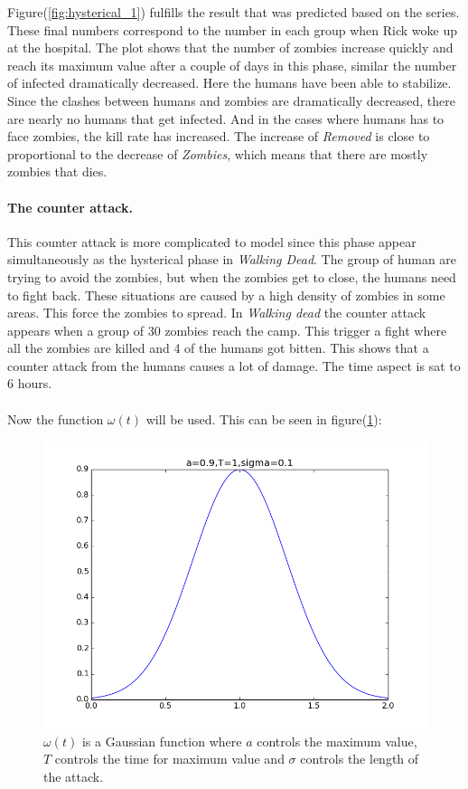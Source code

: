 \documentclass[%
twoside,                 %
final,                   %
10pt]{article}
\begin{document}
Figure(\ref{fig:hysterical_1}) fulfills the result that was predicted based on the series. These final numbers correspond to the number in each group when Rick woke up at the hospital. The plot shows that the number of zombies increase quickly and reach its maximum value after a couple of days in this phase, similar the number of infected dramatically decreased. Here the humans have been able to stabilize. Since the clashes between humans and zombies are dramatically decreased, there are nearly no humans that get infected. And in the cases where humans has to face zombies, the kill rate has increased. The increase of \emph{Removed} is close to proportional to the decrease of \emph{Zombies}, which means that there are mostly zombies that dies.

\paragraph{The counter attack.}
\label{section:counter_attack}
This counter attack is more complicated to model since this phase appear simultaneously as the hysterical phase in \emph{Walking Dead}. The group of human are trying to avoid the zombies, but when the zombies get to close, the humans need to fight back. These situations are caused by a high density of zombies in some areas. This force the zombies to spread. In \emph{Walking dead} the counter attack appears when a group of 30 zombies reach the camp. This trigger a fight where all the zombies are killed and 4 of the humans got bitten. This shows that a counter attack from the humans causes a lot of damage. The time aspect is sat to 6 hours.  
\\
\\
Now the function $\omega(t)$ will be used. This can be seen in figure(\ref{fig:omega_function}):


\begin{figure}[ht]
  \centerline{\includegraphics[width=0.9\linewidth]{plots/omega_function.png}}
  \caption{
  \label{fig:omega_function} $\omega (t)$ is a Gaussian function where $a$ controls the maximum value, $T$ controls the time for maximum value and $\sigma$ controls the length of the attack.
  }
\end{figure}
\end{document}
